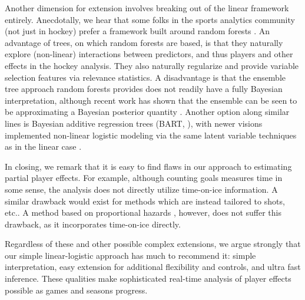 Another dimension for extension involves breaking out of the linear framework
entirely.  Anecdotally, we hear that some folks in the sports analytics
community (not just in hockey) prefer a framework built around random forests
\cite{breiman:2001}.  An advantage of trees, on which random forests are based,
is that they naturally explore (non-linear) interactions between predictors,
and thus players and other effects in the hockey analysis.  They also naturally
regularize and provide variable selection features via relevance statistics.  
A disadvantage is that the ensemble tree approach random forests provides does
not readily have a fully Bayesian interpretation, although recent work has 
shown that the ensemble can be seen to be approximating a Bayesian posterior
quantity \cite{taddy:eta:2015}.  Another option along similar lines is Bayesian
additive regression trees (BART, \cite{ChipGeorMcCu2010}), with newer visions
implemented non-linear logistic modeling via the same latent variable
techniques as in the linear case \cite{gra:pols:2012}.

In closing, we remark that it is easy to find flaws in our approach to
estimating partial player effects.  For example, although counting goals
measures time in some sense, the analysis does not directly utilize
time-on-ice information.  A similar drawback would exist for methods which are
instead tailored to shots, etc..  A method based on proportional hazards
\cite{ThoVenJen12}, however, does not suffer this drawback, as it incorporates
time-on-ice directly.  

Regardless of these and other possible complex extensions, we argue strongly that our simple linear-logistic approach has much
to recommend it: simple interpretation, easy extension for additional flexibility and controls, and ultra fast inference.  These qualities make sophisticated real-time analysis of player effects possible as games
and seasons progress.


